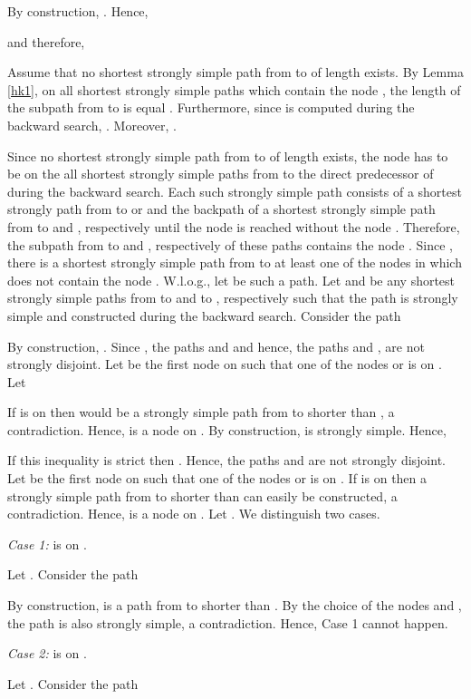 \documentclass[12pt,twoside,a4paper]{article}
\begin{document}
By construction, . 
Hence,

and therefore,

Assume that no shortest strongly simple path from  to  of length  exists. 
By Lemma \ref{hk1}, on all shortest strongly simple paths which contain the node 
, the length of the subpath from  to  is equal
. Furthermore, since  is computed during the backward 
search, . Moreover, 
.

Since no shortest strongly simple path from  to  of length  exists, the node
 has to be on the all shortest strongly simple paths from  to the direct
predecessor of  during the backward search. Each such strongly simple path consists of
a shortest strongly path from  to  or  and the backpath of a shortest strongly 
simple path from  to  and , respectively until the node  is reached 
without the node . Therefore, the subpath from  to  and , 
respectively of these paths contains the node .
Since , there is a shortest strongly simple path 
from  to at least one of the nodes in  which does not contain the node 
. W.l.o.g., let  be such a path.
Let  and  be any 
shortest strongly simple paths from  to  and to , respectively such that
the path  
is strongly simple and constructed during the backward search. Consider the path

By construction, . Since , the paths  and  and hence, the
paths  and , are not strongly disjoint. Let  be the first node on  
such that one of the nodes  or  is on . Let

If  is on  then  would be a strongly simple path from
 to  shorter than , a contradiction. Hence,  is a node on .
By construction,  is strongly simple. Hence, 

If this inequality is strict then .
Hence, the paths  and  are not strongly disjoint. 
Let  be the first node on  such that one of the nodes
 or  is on . If  is on  then a strongly simple path from 
to  shorter than  can easily be constructed, a contradiction. Hence,  is 
a node on . Let .  We distinguish two cases.

\medskip
\noindent
{\em Case 1:}  is on .

\medskip
Let . Consider the path 

By construction,  is a path from  to  shorter than .
By the choice of the nodes  and , the path  is also strongly simple, a 
contradiction. Hence, Case 1 cannot happen.

\medskip
\noindent
{\em Case 2:}  is on .

\medskip
Let . Consider the path
\end{document}
